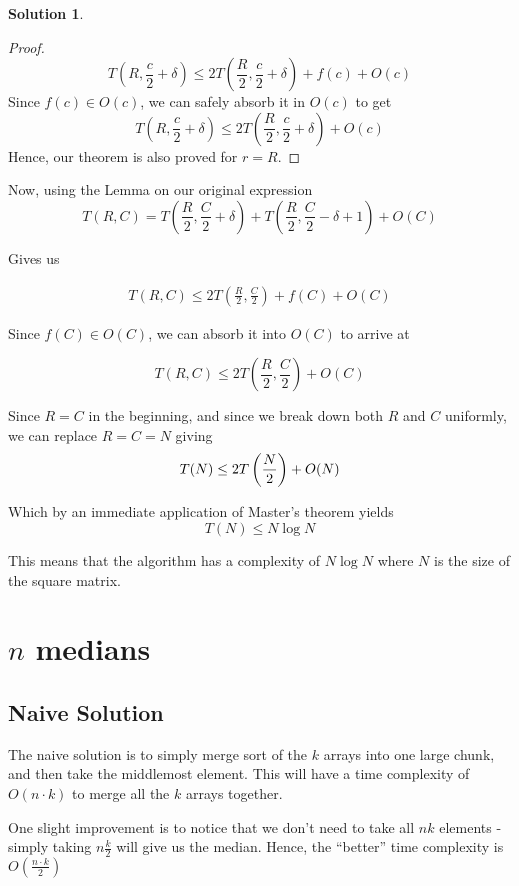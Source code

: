 \documentclass[11pt]{article}
\theoremstyle{definition}
\newtheorem*{solution}{Solution}
\begin{document}
\begin{solution}
\begin{proof}
        $$
        T \left(R, \frac{c}{2} + \delta \right)  \leq 2T\left(\frac{R}{2}, \frac{c}{2} + \delta \right) + f(c) + O(c)
        $$
        Since $f(c) \in O(c)$, we can safely absorb it in $O(c)$ to get
        $$
        T \left(R, \frac{c}{2} + \delta \right)  \leq 2T\left(\frac{R}{2}, \frac{c}{2} + \delta \right) + O(c)
        $$
        Hence, our theorem is also proved for $r = R$.
    \end{proof}

    Now, using the Lemma on our original expression
    $$
    T(R, C) = T\left(\frac{R}{2}, \frac{C}{2} + \delta\right) + T\left(\frac{R}{2}, \frac{C}{2} - \delta + 1\right) + O(C)
    $$
    
    Gives us

    \begin{gather*}
   	T(R, C) \leq 2 T \left(\frac{R}{2}, \frac{C}{2} \right) + f(C) +  O(C) \tag{$f(C) \in O(C)$}
    \end{gather*}
    
    Since $f(C) \in O(C)$, we can absorb it into $O(C)$ to arrive at 
    
    $$
	T(R, C) \leq 2 T \left(\frac{R}{2}, \frac{C}{2} \right) + O(C)
    $$
    
    Since $R = C$ in the beginning, and since we break down both $R$ and $C$ uniformly, we can replace $R = C = N$ giving
    $$
    T(N) \leq  2 T \left( \frac{N}{2} \right) + O(N) \\
    $$


    Which by an immediate application of Master's theorem yields $$T(N) \leq N \log N$$

    This means that the 
    algorithm has a complexity of $N \log N$ where $N$ is the size of the square matrix.
\end{solution}

\section{$n$ medians}
\subsection{Naive Solution}
The naive solution is to simply merge sort of the $k$ arrays into one large chunk, and then
take the middlemost element. This will have a time complexity of $O(n \cdot k)$ to merge all the $k$ arrays together.

One slight improvement is to notice that we don't need to take all $nk$ elements - simply taking
$n\frac{k}{2}$ will give us the median. Hence, the ``better'' time complexity is $O(\frac{n \cdot k}{2})$
\end{document}
